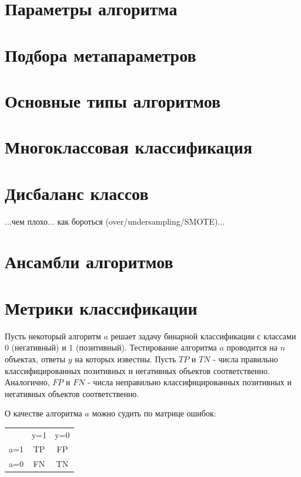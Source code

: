 \section{Параметры алгоритма}


\section{Подбора метапараметров}


\section{Основные типы алгоритмов}


\section{Многоклассовая классификация}


\section{Дисбаланс классов}

...чем плохо... как бороться (over/undersampling/SMOTE)...


\section{Ансамбли алгоритмов}


\section{Метрики классификации}

Пусть некоторый алгоритм $a$ решает задачу бинарной классификации с классами $0$ (негативный) и $1$ (позитивный).
Тестирование алгоритма $a$ проводится на $n$ объектах, ответы $y$ на которых известны. Пусть $TP$ и $TN$ - числа правильно классифицированных позитивных и негативных объектов соответственно. Аналогично, $FP$ и $FN$ - числа неправильно классифицированных позитивных и негативных объектов соответственно.

О качестве алгоритма $a$ можно судить по матрице ошибок:
\begin{center}
\begin{tabular}{ c c c }
     & y=1 & y=0 \\ 
 a=1 & TP  & FP \\  
 a=0 & FN  & TN    
\end{tabular}
\end{center}

